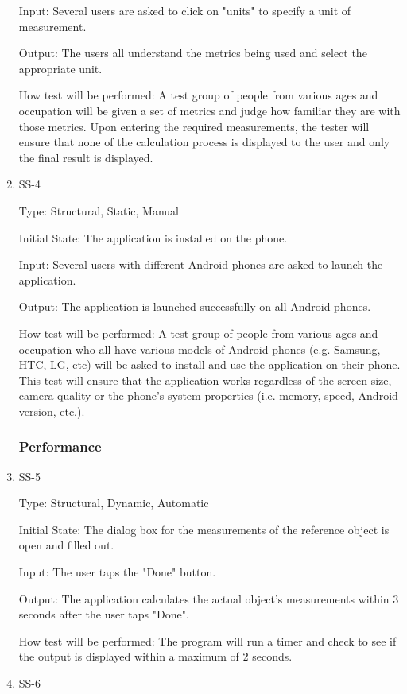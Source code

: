 \documentclass[12pt, titlepage]{article}
\begin{document}
\begin{enumerate}
Input: Several users are asked to click on "units" to specify a unit of measurement.

Output: The users all understand the metrics being used and select the appropriate unit.

How test will be performed: A test group of people from various ages and occupation will be given a set of metrics and judge how familiar they are with those metrics. Upon entering the required measurements, the tester will ensure that none of the calculation process is displayed to the user and only the final result is displayed.

\item{SS-4\\}

Type: Structural, Static, Manual

Initial State: The application is installed on the phone.

Input: Several users with different Android phones are asked to launch the application.

Output: The application is launched successfully on all Android phones.

How test will be performed: A test group of people from various ages and occupation who all have various models of Android phones (e.g. Samsung, HTC, LG, etc) will be asked to install and use the application on their phone. This test will ensure that the application works regardless of the screen size, camera quality or the phone's system properties (i.e. memory, speed, Android version, etc.).

\subsubsection{Performance}
\item{SS-5\\}

Type: Structural, Dynamic, Automatic

Initial State: The dialog box for the measurements of the reference object is open and filled out.

Input: The user taps the "Done" button.

Output: The application calculates the actual object's measurements within 3 seconds after the user taps "Done".

How test will be performed: The program will run a timer and check to see if the output is displayed within a maximum of 2 seconds.

\item{SS-6\\}


\end{enumerate}
\end{document}
